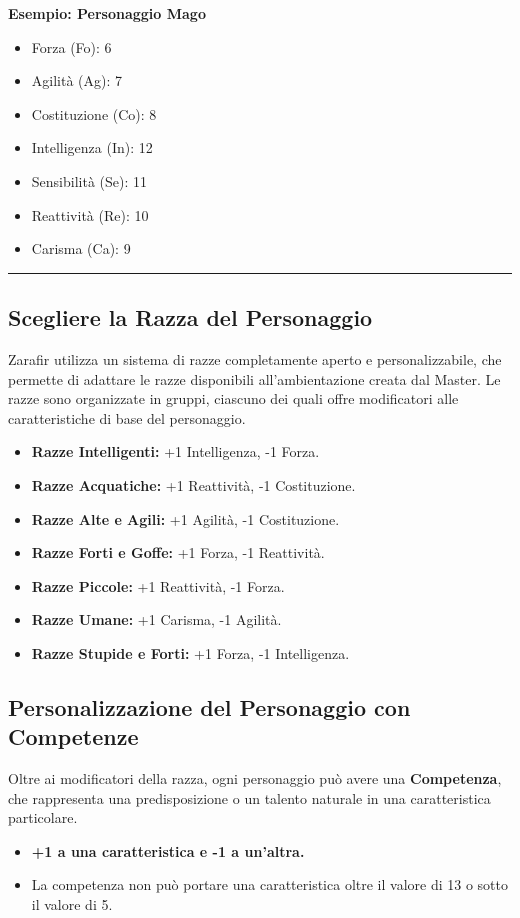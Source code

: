 \documentclass[../manuale_main.tex]{subfiles}
\begin{document}
\textbf{Esempio: Personaggio Mago}
\begin{itemize}
    \item Forza (Fo): 6
    \item Agilità (Ag): 7
    \item Costituzione (Co): 8
    \item Intelligenza (In): 12
    \item Sensibilità (Se): 11
    \item Reattività (Re): 10
    \item Carisma (Ca): 9
\end{itemize}

\vspace{0.5cm}
\rule{\textwidth}{0.4pt}
\vspace{0.5cm}

\subsection{Scegliere la Razza del Personaggio}
Zarafir utilizza un sistema di razze completamente aperto e personalizzabile, che permette di adattare le razze disponibili all’ambientazione creata dal Master. Le razze sono organizzate in gruppi, ciascuno dei quali offre modificatori alle caratteristiche di base del personaggio.

\begin{itemize}
    \item \textbf{Razze Intelligenti:} +1 Intelligenza, -1 Forza.
    \item \textbf{Razze Acquatiche:} +1 Reattività, -1 Costituzione.
    \item \textbf{Razze Alte e Agili:} +1 Agilità, -1 Costituzione.
    \item \textbf{Razze Forti e Goffe:} +1 Forza, -1 Reattività.
    \item \textbf{Razze Piccole:} +1 Reattività, -1 Forza.
    \item \textbf{Razze Umane:} +1 Carisma, -1 Agilità.
    \item \textbf{Razze Stupide e Forti:} +1 Forza, -1 Intelligenza.
\end{itemize}

\vspace{0.3cm}

\subsection{Personalizzazione del Personaggio con Competenze}
Oltre ai modificatori della razza, ogni personaggio può avere una \textbf{Competenza}, che rappresenta una predisposizione o un talento naturale in una caratteristica particolare. 

\begin{itemize}
    \item \textbf{+1 a una caratteristica e -1 a un’altra.}
    \item La competenza non può portare una caratteristica oltre il valore di 13 o sotto il valore di 5.
\end{itemize}
\end{document}
